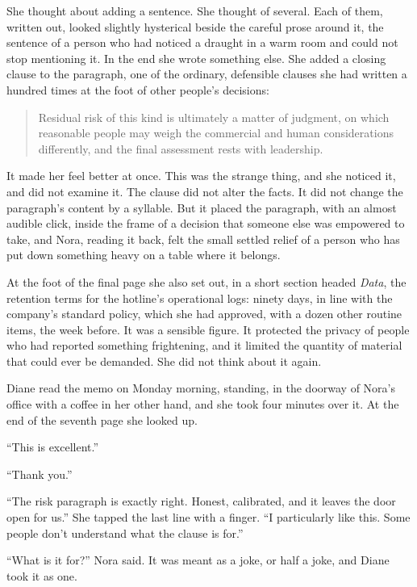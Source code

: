 She thought about adding a sentence. She thought of several. Each of them, written out, looked slightly hysterical beside the careful prose around it, the sentence of a person who had noticed a draught in a warm room and could not stop mentioning it. In the end she wrote something else. She added a closing clause to the paragraph, one of the ordinary, defensible clauses she had written a hundred times at the foot of other people's decisions:

\begin{quote}
Residual risk of this kind is ultimately a matter of judgment, on which reasonable people may weigh the commercial and human considerations differently, and the final assessment rests with leadership.
\end{quote}

It made her feel better at once. This was the strange thing, and she noticed it, and did not examine it. The clause did not alter the facts. It did not change the paragraph's content by a syllable. But it placed the paragraph, with an almost audible click, inside the frame of a decision that someone else was empowered to take, and Nora, reading it back, felt the small settled relief of a person who has put down something heavy on a table where it belongs.

At the foot of the final page she also set out, in a short section headed \emph{Data}, the retention terms for the hotline's operational logs: ninety days, in line with the company's standard policy, which she had approved, with a dozen other routine items, the week before. It was a sensible figure. It protected the privacy of people who had reported something frightening, and it limited the quantity of material that could ever be demanded. She did not think about it again.

Diane read the memo on Monday morning, standing, in the doorway of Nora's office with a coffee in her other hand, and she took four minutes over it. At the end of the seventh page she looked up.

``This is excellent.''

``Thank you.''

``The risk paragraph is exactly right. Honest, calibrated, and it leaves the door open for us.'' She tapped the last line with a finger. ``I particularly like this. Some people don't understand what the clause is for.''

``What is it for?'' Nora said. It was meant as a joke, or half a joke, and Diane took it as one.

